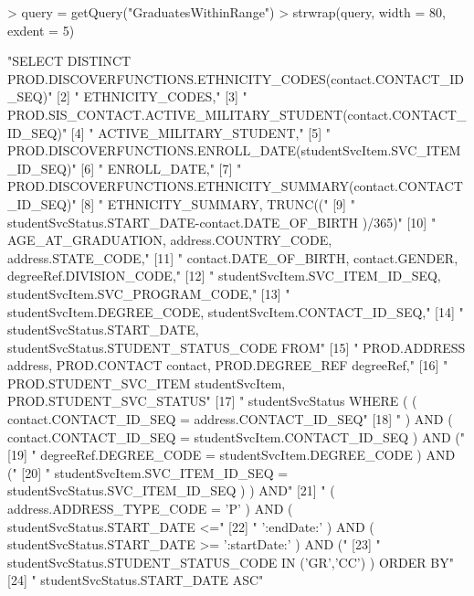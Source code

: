 \documentclass[letterpaper,11pt]{article}
\begin{document}
\begin{Schunk}
\begin{Sinput}
> query = getQuery("GraduatesWithinRange")
> strwrap(query, width = 80, exdent = 5)
\end{Sinput}
\begin{Soutput}
 [1] "SELECT DISTINCT PROD.DISCOVERFUNCTIONS.ETHNICITY_CODES(contact.CONTACT_ID_SEQ)" 
 [2] "     ETHNICITY_CODES,"                                                          
 [3] "     PROD.SIS_CONTACT.ACTIVE_MILITARY_STUDENT(contact.CONTACT_ID_SEQ)"          
 [4] "     ACTIVE_MILITARY_STUDENT,"                                                  
 [5] "     PROD.DISCOVERFUNCTIONS.ENROLL_DATE(studentSvcItem.SVC_ITEM_ID_SEQ)"        
 [6] "     ENROLL_DATE,"                                                              
 [7] "     PROD.DISCOVERFUNCTIONS.ETHNICITY_SUMMARY(contact.CONTACT_ID_SEQ)"          
 [8] "     ETHNICITY_SUMMARY, TRUNC(("                                                
 [9] "     studentSvcStatus.START_DATE-contact.DATE_OF_BIRTH )/365)"                  
[10] "     AGE_AT_GRADUATION, address.COUNTRY_CODE, address.STATE_CODE,"              
[11] "     contact.DATE_OF_BIRTH, contact.GENDER, degreeRef.DIVISION_CODE,"           
[12] "     studentSvcItem.SVC_ITEM_ID_SEQ, studentSvcItem.SVC_PROGRAM_CODE,"          
[13] "     studentSvcItem.DEGREE_CODE, studentSvcItem.CONTACT_ID_SEQ,"                
[14] "     studentSvcStatus.START_DATE, studentSvcStatus.STUDENT_STATUS_CODE FROM"    
[15] "     PROD.ADDRESS address, PROD.CONTACT contact, PROD.DEGREE_REF degreeRef,"    
[16] "     PROD.STUDENT_SVC_ITEM studentSvcItem, PROD.STUDENT_SVC_STATUS"             
[17] "     studentSvcStatus WHERE ( ( contact.CONTACT_ID_SEQ = address.CONTACT_ID_SEQ"
[18] "     ) AND ( contact.CONTACT_ID_SEQ = studentSvcItem.CONTACT_ID_SEQ ) AND ("    
[19] "     degreeRef.DEGREE_CODE = studentSvcItem.DEGREE_CODE ) AND ("                
[20] "     studentSvcItem.SVC_ITEM_ID_SEQ = studentSvcStatus.SVC_ITEM_ID_SEQ ) ) AND" 
[21] "     ( address.ADDRESS_TYPE_CODE = 'P' ) AND ( studentSvcStatus.START_DATE <="  
[22] "     ':endDate:' ) AND ( studentSvcStatus.START_DATE >= ':startDate:' ) AND ("  
[23] "     studentSvcStatus.STUDENT_STATUS_CODE IN ('GR','CC') ) ORDER BY"            
[24] "     studentSvcStatus.START_DATE ASC"                                           
\end{Soutput}
\end{Schunk}
\end{document}

